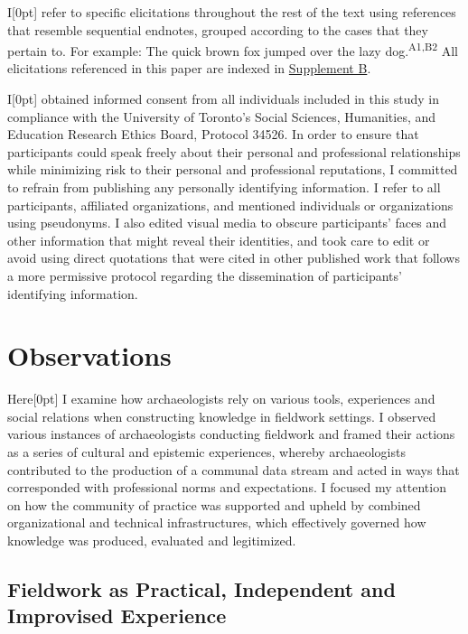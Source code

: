 \documentclass[
]{article}
\newcommand{\paragraphnumber}[1]{\marginnote{\color{lightgray}\tiny{#1}}[0pt]}
\begin{document}
I\paragraphnumber{[40]} refer to specific elicitations throughout the
rest of the text using references that resemble sequential endnotes,
grouped according to the cases that they pertain to. For example: The
quick brown fox jumped over the lazy dog.\textsuperscript{A1,B2} All
elicitations referenced in this paper are indexed in
\hyperref[supplement-b]{Supplement B}.

I\paragraphnumber{[41]} obtained informed consent from all individuals
included in this study in compliance with the University of Toronto's
Social Sciences, Humanities, and Education Research Ethics Board,
Protocol 34526. In order to ensure that participants could speak freely
about their personal and professional relationships while minimizing
risk to their personal and professional reputations, I committed to
refrain from publishing any personally identifying information. I refer
to all participants, affiliated organizations, and mentioned individuals
or organizations using pseudonyms. I also edited visual media to obscure
participants' faces and other information that might reveal their
identities, and took care to edit or avoid using direct quotations that
were cited in other published work that follows a more permissive
protocol regarding the dissemination of participants' identifying
information.

\section{Observations}\label{observations}

Here\paragraphnumber{[42]} I examine how archaeologists rely on various
tools, experiences and social relations when constructing knowledge in
fieldwork settings. I observed various instances of archaeologists
conducting fieldwork and framed their actions as a series of cultural
and epistemic experiences, whereby archaeologists contributed to the
production of a communal data stream and acted in ways that corresponded
with professional norms and expectations. I focused my attention on how
the community of practice was supported and upheld by combined
organizational and technical infrastructures, which effectively governed
how knowledge was produced, evaluated and legitimized.

\subsection{Fieldwork as Practical, Independent and Improvised
Experience}\label{fieldwork-as-practical-independent-and-improvised-experience}
\end{document}
